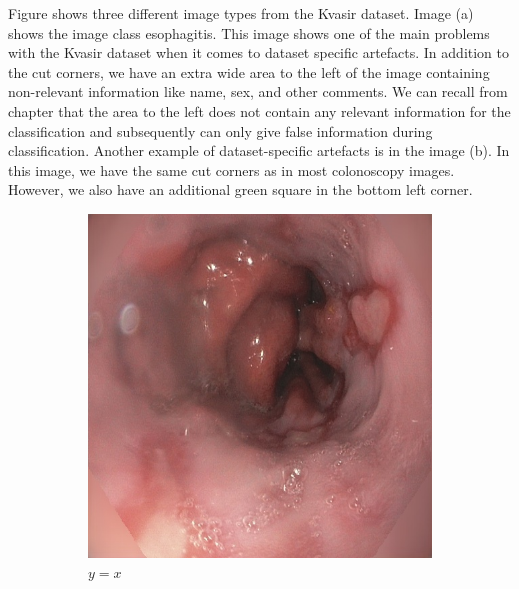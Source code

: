 Figure  shows three different image types from the Kvasir dataset. 
Image (a) shows the image class esophagitis. This image shows one of the main problems with the Kvasir dataset when it comes to dataset specific artefacts. In addition to the cut corners, we have an extra wide area to the left of the image containing non-relevant information like name, sex, and other comments. We can recall from chapter  that the area to the left does not contain any relevant information for the classification and subsequently can only give false information during classification. 
Another example of dataset-specific artefacts is in the image (b). In this image, we have the same cut corners as in most colonoscopy images. However, we also have an additional green square in the bottom left corner.

\begin{figure}
     \centering
     \begin{subfigure}[b]{0.5\textwidth}
         \centering
         \includegraphics[width=\textwidth]{experiments/figures/noleftframe.jpg}
         \caption{$y=x$}
         \label{fig:y equals x}
     \end{subfigure}
     \hfill
     \begin{subfigure}[b]{0.5\textwidth}
         \centering

\end{subfigure}
\end{figure}
